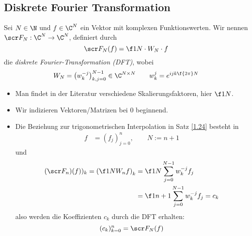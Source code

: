 \documentclass[11pt]{scrbook}
\begin{document}
\subsection{Diskrete Fourier Transformation}

\begin{df} \label{1.26}
	Sei $N\in \N$ und $f\in \C^N$ ein Vektor mit komplexen Funktionswerten.
	Wir nennen $\scr F_N: \C^N \to \C^N$, definiert durch
	\[
		\scr F_N(f) = \f 1N \cdot W_N \cdot f
	\]
	die \emph{diskrete Fourier-Transformation (DFT)}, wobei
	\[
		W_N = \big(w_{k}^{-j}\big)_{k,j=0}^{N-1} \in \C^{N\times N} \qquad w_{k}^j = e^{ijk \f {2\pi}N}
	\]
	\begin{note}
		\begin{itemize}
			\item
				Man findet in der Literatur verschiedene Skalierungsfaktoren, hier $\f 1N$.
			\item
				Wir indizieren Vektoren/Matrizen bei $0$ beginnend.		
			\item
				Die Beziehung zur trigonometrischen Interpolation in Satz \ref{1.24} besteht in
				\begin{align*}
					f &= (f_j)_{j=0}^n, \qquad N:= n+1
				\end{align*}
				und
				\begin{align*}
					(\scr F_n)(f))_k = \left( \f 1N W_n f\right)_k &= \f 1N \sum_{j=0}^{N-1}w_k^{-j} f_j \\
					&= \f 1{n+1} \sum_{j=0}^{N-1}w_k^{-j} f_j = c_k
				\end{align*}
				also werden die Koeffizienten $c_k$ durch die DFT erhalten:
				\[
					(c_k)_{k=0}^n = \scr F_N(f)
				\]
		\end{itemize}
	\end{note}
\end{df}
\end{document}
